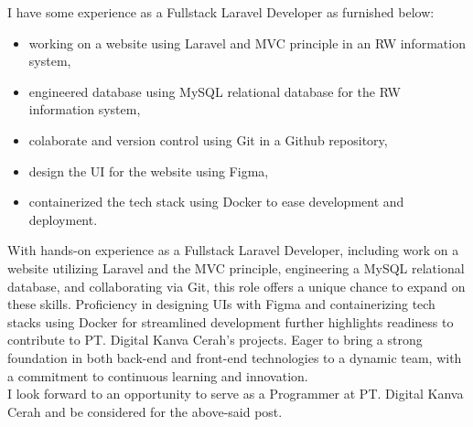 \documentclass[11pt,a4paper,roman]{moderncv}
\begin{document}
I have some experience as a Fullstack Laravel Developer as furnished below:
\vspace{0.5em}
\begin{itemize}
\item working on a website using Laravel and MVC principle in an RW information system,
\item engineered database using MySQL relational database for the RW information system,
\item colaborate and version control using Git in a Github repository,
\item design the UI for the website using Figma,
\item containerized the tech stack using Docker to ease development and deployment.
\end{itemize}

\vspace{1em}
With hands-on experience as a Fullstack Laravel Developer, including work on a website utilizing Laravel and the MVC principle, engineering a MySQL relational database, and collaborating via Git, this role offers a unique chance to expand on these skills. Proficiency in designing UIs with Figma and containerizing tech stacks using Docker for streamlined development further highlights readiness to contribute to PT. Digital Kanva Cerah's projects. Eager to bring a strong foundation in both back-end and front-end technologies to a dynamic team, with a commitment to continuous learning and innovation. \\

\vspace{1em}
I look forward to an opportunity to serve as a Programmer at PT. Digital Kanva Cerah and be considered for the above-said post.

\vspace{0.5cm}


\makeletterclosing
\end{document}
